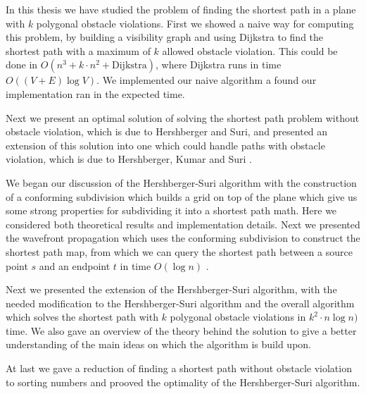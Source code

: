 In this thesis we have studied the problem of finding the shortest path in a plane with $k$ 
polygonal obstacle violations. First we showed a naive way for computing this problem, by 
building a visibility graph and using Dijkstra to find the shortest path with a maximum of 
$k$ allowed obstacle violation. This could be done in $O(n^3 + k \cdot n^2 + \text{Dijkstra})$, 
where Dijkstra runs in time $O((V + E) \log V)$. We implemented our naive algorithm a found 
our implementation ran in the expected time. 

Next we present an optimal solution of solving the shortest path problem without obstacle violation, 
which is due to Hershberger and Suri\cite{HershbergerS99}, and presented an extension of this solution 
into one which could handle paths with obstacle violation, which is due to Hershberger, Kumar and Suri
\cite{HershbergerKS17}. 

We began our discussion of the Hershberger-Suri algorithm with the construction of a conforming 
subdivision which builds a grid on top of the plane which give us some strong properties for subdividing 
it into a shortest path math. Here we considered both theoretical results and implementation details. 
Next we presented the wavefront propagation which uses the conforming subdivision to construct 
the shortest path map, from which we can query the shortest path between a source point $s$ 
and an endpoint $t$ in time $O(\log n)$ \cite{DBLP:journals/siamcomp/Kirkpatrick83}. 

Next we presented the extension of the Hershberger-Suri algorithm, with the needed modification
to the Hershberger-Suri algorithm and the overall algorithm which solves the shortest path with
$k$ polygonal obstacle violations in $k^2 \cdot n \log n)$ time. We also gave an overview of the
theory behind the solution to give a better understanding of the main ideas on which the algorithm
is build upon.

At last we gave a reduction of finding a shortest path without obstacle violation to sorting numbers
and prooved the optimality of the Hershberger-Suri algorithm.

